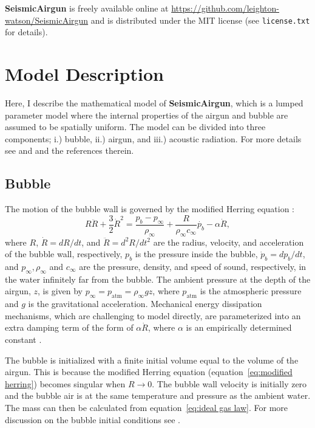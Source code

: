 \documentclass[10pt]{article}
\begin{document}
{\bf SeismicAirgun} is freely available online at \href{https://github.com/leighton-watson/SeismicAirgun}{https://github.com/leighton-watson/SeismicAirgun} and is distributed under the MIT license (see \texttt{license.txt} for details). 

\newpage
\section{Model Description}
Here, I describe the mathematical model of {\bf SeismicAirgun}, which is a lumped parameter model where the internal properties of the airgun and bubble are assumed to be spatially uniform. The model can be divided into three components; i.) bubble, ii.) airgun, and iii.) acoustic radiation. For more details see \citet{Chelminski2019} and \citet{Watson2016} and the references therein. 

\subsection{Bubble}
The motion of the bubble wall is governed by the modified Herring equation \citep{Herring1941,Cole1948,Vokurka1986}:
\begin{equation}
R \ddot{R}+ \frac{3}{2} \dot{R}^2 = \frac{p_b - p_\infty}{\rho_\infty} + \frac{R}{\rho_\infty c_\infty} \dot{p_b} - \alpha \dot{R},
\label{eq:modified herring}
\end{equation}
where $R$, $\dot{R}=dR/dt$, and $\ddot{R}=d^2R/dt^2$ are the radius, velocity, and acceleration of the bubble wall, respectively, $p_b$ is the pressure inside the bubble, $\dot{p}_b = dp_b/dt$, and $p_\infty, \rho_\infty$ and $c_\infty$ are the pressure, density, and speed of sound, respectively, in the water infinitely far from the bubble. The ambient pressure at the depth of the airgun, $z$, is given by $p_\infty = p_\text{atm} = \rho_\infty g z$, where $p_\text{atm}$ is the atmospheric pressure and $g$ is the gravitational acceleration. Mechanical energy dissipation mechanisms, which are challenging to model directly, are parameterized into an extra damping term of the form of $\alpha \dot{R}$, where $\alpha$ is an empirically determined constant \cite{Langhammer1996,Watson2017_airgun}.

The bubble is initialized with a finite initial volume equal to the volume of the airgun. This is because the modified Herring equation (equation~\ref{eq:modified herring}) becomes singular when $R\rightarrow0$. The bubble wall velocity is initially zero and the bubble air is at the same temperature and pressure as the ambient water. The mass can then be calculated from equation~\ref{eq:ideal gas law}. For more discussion on the bubble initial conditions see \citet{Watson2019_airgun}.
\end{document}
